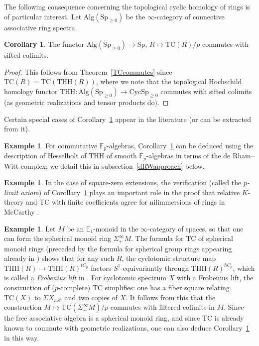 \documentclass{amsart}
\newcommand{\THH}{\mathrm{THH}}
\newcommand{\Sp}{\mathrm{Sp}}
\theoremstyle{definition}
\newtheorem{example}[definition]{Example}
\newtheorem{corollary}[definition]{Corollary}
\newcommand{\CycSp}{\mathrm{CycSp}}
\newcommand{\TC}{\mathrm{TC}}
\begin{document}
The following consequence concerning the topological cyclic homology of rings is of particular interest. Let $\mathrm{Alg}(\Sp_{\geq 0})$ be the $\infty$-category of connective
associative ring spectra.


\begin{corollary} 
\label{TCring}
The functor $\mathrm{Alg}(\Sp_{\geq 0})\to\Sp$, $R \mapsto \TC(R)/p$ commutes with
sifted colimits. 
\end{corollary} 
\begin{proof} 
This follows from Theorem~\ref{TCcommutes} since $\TC(R) = \TC( \THH(R))$, where we note that
the topological Hochschild homology functor
$\THH: \mathrm{Alg}(\Sp_{\geq 0}) \to \CycSp_{\geq 0}$ commutes
with sifted colimits (as geometric realizations and tensor products do).
\end{proof} 


Certain special cases of Corollary~\ref{TCring} appear in the literature (or
can be extracted from it). 

\begin{example} 
For commutative $\mathbb{F}_p$-algebras, Corollary~\ref{TCring} can be deduced
using the description of Hesselholt \cite{Hesselholt} of $\THH$ of smooth
$\mathbb{F}_p$-algebras in terms of the de Rham--Witt complex; we detail this in
subsection~\ref{dRWapproach} below.
\end{example} 


\begin{example} 
In the case of square-zero extensions, 
the verification (called the \emph{$p$-limit axiom})  of
Corollary~\ref{TCring} plays an important role in
the proof that relative $K$-theory and $\TC$ with finite coefficients agree for nilimmersions of rings
in McCarthy \cite{mccarthy}. 
\end{example} 

\begin{example} 
Let $M$ be an $\mathbb{E}_1$-monoid in the $\infty$-category of spaces, so that
one can form the spherical monoid ring $\Sigma^\infty_+ M$. 
The formula for $\TC$ of spherical 
monoid rings \cite[Lemma IV.3.1]{nikolaus-scholze} (preceded by the formula for
spherical group rings appearing already in \cite[Eq. (0.3)]{BHM})
shows that for any such $R$, 
the cyclotomic structure map $\THH(R) \to \THH(R)^{tC_p}$ factors
$S^1$-equivariantly through
$\THH(R)^{hC_p}$, which is called a \emph{Frobenius lift} in
\cite{nikolaus-scholze}. For cyclotomic spectrum $X$ with a Frobenius lift, the construction  of
($p$-complete) $\TC$ simplifies: one has a fiber square 
\cite[Prop. IV-3.4]{nikolaus-scholze} relating $\TC(X)$ to $\Sigma
X_{hS^1}$ and two copies of $X$. It follows from this that the construction  
$M \mapsto \TC( \Sigma^\infty_+ M)/p$ commutes with filtered colimits in $M$. 
Since the free associative algebra is a spherical monoid ring, and since $\TC$
is already known to commute with geometric realizations, one can also deduce
Corollary~\ref{TCring} in this way.
\end{example} 
\end{document}
